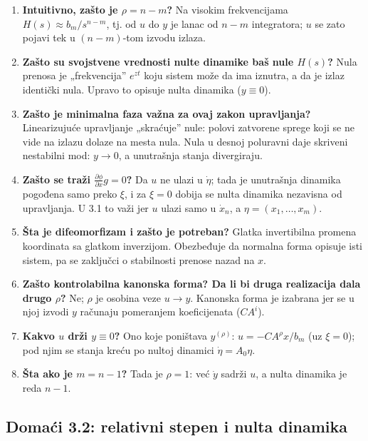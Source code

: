 \documentclass[11pt,a4paper,parskip=half,headsepline,numbers=noenddot]{scrartcl}
\begin{document}
\begin{enumerate}
\def\labelenumi{\arabic{enumi}.}
\item \textbf{Intuitivno, zašto je \(\rho = n - m\)?} Na visokim frekvencijama \(H(s) \approx b_m/s^{n-m}\), tj. od \(u\) do \(y\) je lanac od \(n - m\) integratora; \(u\) se zato pojavi tek u \((n - m)\)-tom izvodu izlaza.
\item \textbf{Zašto su svojstvene vrednosti nulte dinamike baš nule \(H(s)\)?} Nula prenosa je „frekvencija'' \(e^{zt}\) koju sistem može da ima iznutra, a da je izlaz identički nula. Upravo to opisuje nulta dinamika (\(y \equiv 0\)).
\item \textbf{Zašto je minimalna faza važna za ovaj zakon upravljanja?} Linearizujuće upravljanje „skraćuje'' nule: polovi zatvorene sprege koji se ne vide na izlazu dolaze na mesta nula. Nula u desnoj poluravni daje skriveni nestabilni mod: \(y \to 0\), a unutrašnja stanja divergiraju.
\item \textbf{Zašto se traži \(\frac{\partial\phi}{\partial x}g = 0\)?} Da \(u\) ne ulazi u \(\dot\eta\); tada je unutrašnja dinamika pogođena samo preko \(\xi\), i za \(\xi = 0\) dobija se nulta dinamika nezavisna od upravljanja. U 3.1 to važi jer \(u\) ulazi samo u \(\dot x_n\), a \(\eta = (x_1, \dots, x_m)\).
\item \textbf{Šta je difeomorfizam i zašto je potreban?} Glatka invertibilna promena koordinata sa glatkom inverzijom. Obezbeđuje da normalna forma opisuje isti sistem, pa se zaključci o stabilnosti prenose nazad na \(x\).
\item \textbf{Zašto kontrolabilna kanonska forma? Da li bi druga realizacija dala drugo \(\rho\)?} Ne; \(\rho\) je osobina veze \(u \to y\). Kanonska forma je izabrana jer se u njoj izvodi \(y\) računaju pomeranjem koeficijenata (\(CA^i\)).
\item \textbf{Kakvo \(u\) drži \(y \equiv 0\)?} Ono koje poništava \(y^{(\rho)}\): \(u = -CA^\rho x/b_m\) (uz \(\xi = 0\)); pod njim se stanja kreću po nultoj dinamici \(\dot\eta = A_0\eta\).
\item \textbf{Šta ako je \(m = n - 1\)?} Tada je \(\rho = 1\): već \(\dot y\) sadrži \(u\), a nulta dinamika je reda \(n - 1\).
\end{enumerate}

\subsection{Domaći 3.2: relativni stepen i nulta dinamika}
\end{document}
